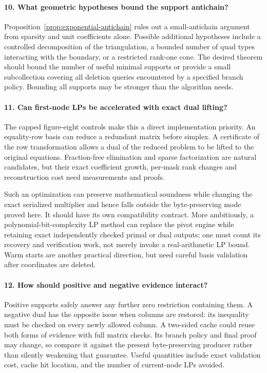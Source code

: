 \paragraph{10. What geometric hypotheses bound the support antichain?}
Proposition~\ref{prop:exponential-antichain} rules out a small-antichain
argument from sparsity and unit coefficients alone. Possible additional
hypotheses include a controlled decomposition of the triangulation, a
bounded number of quad types interacting with the boundary, or a restricted
rank-one cone. The desired theorem should bound the number of useful
minimal supports or provide a small subcollection covering all deletion
queries encountered by a specified branch policy. Bounding all supports
may be stronger than the algorithm needs.

\paragraph{11. Can first-node LPs be accelerated with exact dual lifting?}
The capped figure-eight controls make this a direct implementation priority.
An equality-row basis can reduce a redundant matrix before simplex. A
certificate of the row transformation allows a dual of the reduced problem
to be lifted to the original equations. Fraction-free elimination and sparse
factorization are natural candidates, but their exact coefficient growth,
per-mask rank changes and reconstruction cost need measurements and proofs.

Such an optimization can preserve mathematical soundness while changing
the exact serialized multiplier and hence falls outside the byte-preserving
mode proved here. It should have its own compatibility contract. More
ambitiously, a polynomial-bit-complexity LP method can replace the pivot
engine while retaining exact independently checked primal or dual outputs;
one must count its recovery and verification work, not merely invoke a
real-arithmetic LP bound. Warm starts are another practical direction,
but need careful basis validation after coordinates are deleted.

\paragraph{12. How should positive and negative evidence interact?}
Positive supports safely answer any further zero restriction containing
them. A negative dual has the opposite issue when columns are restored:
its inequality must be checked on every newly allowed column. A two-sided
cache could reuse both forms of evidence with full matrix checks. Its
branch policy and final proof may change, so compare it against the present
byte-preserving producer rather than silently weakening that guarantee.
Useful quantities include exact validation cost, cache hit location, and
the number of current-node LPs avoided.

